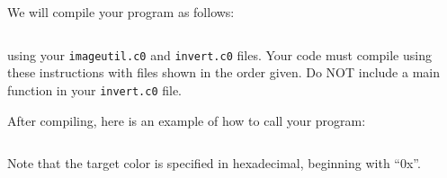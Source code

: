 We will compile your program as follows:
\begin{lstlisting}[language={[coin]C}]
% cc0 -d imageutil.c0 invert.c0 invert-main.c0 -o invert
\end{lstlisting}
using your \lstinline'imageutil.c0' and \lstinline'invert.c0' files.
Your code must compile using these instructions with files shown in the order
given. Do NOT include a main function in your \lstinline'invert.c0' file.

After compiling, here is an example of how to call your program:
\begin{lstlisting}[language={[coin]C}]
% ./invert -i images/g5.png -o images/g5-invert.png -c 0xffcf0000 -t 100
\end{lstlisting}
Note that the target color is specified in hexadecimal, beginning with ``0x''.



